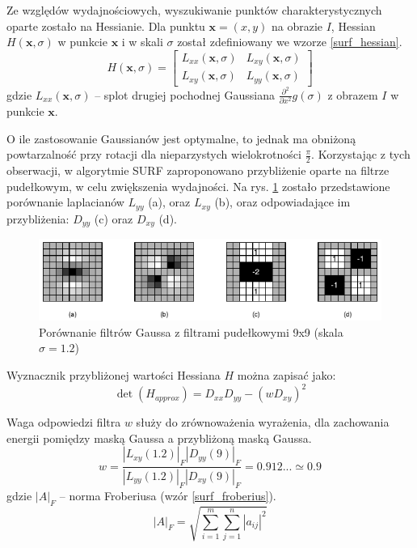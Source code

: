 Ze względów wydajnościowych, wyszukiwanie punktów charakterystycznych oparte zostało na Hessianie. Dla punktu $\boldsymbol{x}=(x, y)$ na obrazie $I$, Hessian $H(\boldsymbol{x}, \sigma)$ w punkcie $\boldsymbol{x}$ i w skali $\sigma$ został zdefiniowany we wzorze \ref{surf_hessian}.
\begin{equation} 
\label{surf_hessian} 
H(\boldsymbol{x}, \sigma) = 
	\begin{bmatrix}
		L_{xx}(\boldsymbol{x}, \sigma) & L_{xy}(\boldsymbol{x}, \sigma) \\
		L_{xy}(\boldsymbol{x}, \sigma) & L_{yy}(\boldsymbol{x}, \sigma)
	\end{bmatrix}
\end{equation} gdzie $L_{xx}(\boldsymbol{x}, \sigma)$ -- splot drugiej pochodnej Gaussiana $\frac{\partial^2}{\partial x^2} g(\sigma)$ z obrazem $I$ w punkcie $\boldsymbol{x}$.

O ile zastosowanie Gaussianów jest optymalne\cite{LINDENBERG90}, to jednak ma obniżoną powtarzalność przy rotacji dla nieparzystych wielokrotności $\frac{\pi}{2}$. Korzystając z tych obserwacji, w algorytmie SURF zaproponowano przybliżenie oparte na filtrze pudełkowym, w celu zwiększenia wydajności. Na rys. \ref{fig:surf-box-filters} zostało przedstawione porównanie laplacianów $L_{yy}$ (a), oraz $L_{xy}$ (b), oraz odpowiadające im przybliżenia: $D_{yy}$ (c) oraz $D_{xy}$ (d).

\begin{figure}[h]
	\centering
	\includegraphics[scale=1.7]{graphics/01_podstawy_teoretyczne/surf-box-filters.pdf}
	\caption{Porównanie filtrów Gaussa z filtrami pudełkowymi 9x9 (skala $\sigma = 1.2$) \cite{BAY08}}
	\label{fig:surf-box-filters}
\end{figure}

Wyznacznik przybliżonej wartości Hessiana $H$ można zapisać jako:
\begin{equation} 
\label{surf_hessian_det}
\det(H_{approx}) = D_{xx} D_{yy} - (w D_{xy})^2
\end{equation}

Waga odpowiedzi filtra $w$ służy do zrównoważenia wyrażenia, dla zachowania energii pomiędzy maską Gaussa a przybliżoną maską Gaussa.
\begin{equation} 
\label{surf_hessian_approx_w}
w = \frac{|L_{xy}(1.2)|_F |D_{yy}(9)|_F}{|L_{yy}(1.2)|_F |D_{xy}(9)|_F} = 0.912... \simeq 0.9
\end{equation} gdzie $|A|_F$ -- norma Froberiusa (wzór \ref{surf_froberius}).
\begin{equation} 
\label{surf_froberius}
|A|_F = \sqrt{\sum\limits_{i=1}^m \sum\limits_{j=1}^n |a_{ij}|^2}
\end{equation}

